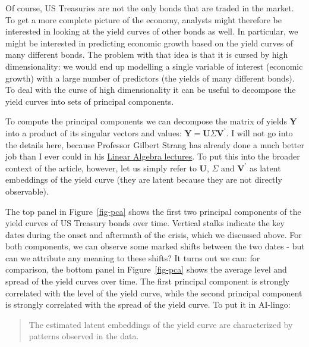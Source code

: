 \documentclass[
  letterpaper,
  DIV=11,
  numbers=noendperiod]{scrartcl}
\theoremstyle{plain}
\theoremstyle{remark}
\begin{document}
Of course, US Treasuries are not the only bonds that are traded in the
market. To get a more complete picture of the economy, analysts might
therefore be interested in looking at the yield curves of other bonds as
well. In particular, we might be interested in predicting economic
growth based on the yield curves of many different bonds. The problem
with that idea is that it is cursed by high dimensionality: we would end
up modelling a single variable of interest (economic growth) with a
large number of predictors (the yields of many different bonds). To deal
with the curse of high dimensionality it can be useful to decompose the
yield curves into sets of principal components.

To compute the principal components we can decompose the matrix of
yields \(\mathbf{Y}\) into a product of its singular vectors and values:
\(\mathbf{Y}=\mathbf{U}\Sigma\mathbf{V}^{\prime}\). I will not go into
the details here, because Professor Gilbert Strang has already done a
much better job than I ever could in his
\href{https://www.youtube.com/watch?v=mBcLRGuAFUk}{Linear Algebra
lectures}. To put this into the broader context of the article, however,
let us simply refer to \(\mathbf{U}\), \(\Sigma\) and
\(\mathbf{V}^{\prime}\) as latent embeddings of the yield curve (they
are latent because they are not directly observable).

The top panel in Figure~\ref{fig-pca} shows the first two principal
components of the yield curves of US Treasury bonds over time. Vertical
stalks indicate the key dates during the onset and aftermath of the
crisis, which we discussed above. For both components, we can observe
some marked shifts between the two dates - but can we attribute any
meaning to these shifts? It turns out we can: for comparison, the bottom
panel in Figure~\ref{fig-pca} shows the average level and spread of the
yield curves over time. The first principal component is strongly
correlated with the level of the yield curve, while the second principal
component is strongly correlated with the spread of the yield curve. To
put it in AI-lingo:

\begin{quote}
The estimated latent embeddings of the yield curve are characterized by
patterns observed in the data.
\end{quote}
\end{document}
